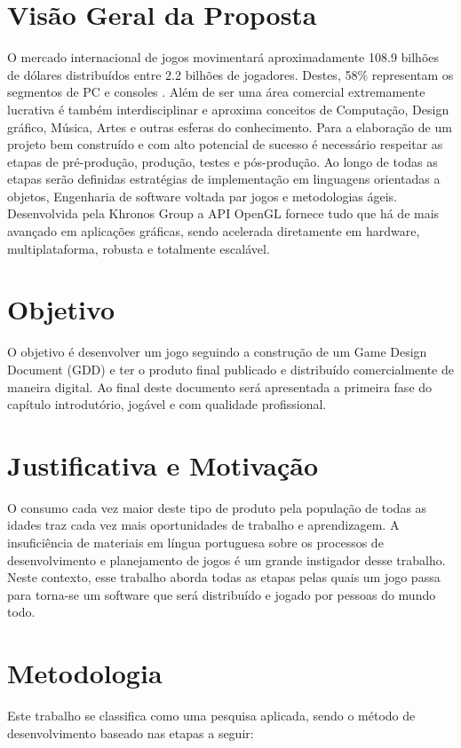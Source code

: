 \documentclass[12pt, 
openright, 
oneside, 
a4paper,    
brazil]{facom-ufu-abntex2}
\begin{document}
\section{Visão Geral da Proposta}
O mercado internacional de jogos movimentará aproximadamente 108.9
bilhões de dólares distribuídos entre 2.2 bilhões de jogadores. Destes, 58\%
representam os segmentos de PC e consoles \cite{GameMarketArticle}. Além de ser uma área
comercial extremamente lucrativa é também interdisciplinar e aproxima
conceitos de Computação, Design gráfico, Música, Artes e outras esferas do
conhecimento.
Para a elaboração de um projeto bem construído e com alto potencial de
sucesso é necessário respeitar as etapas de pré-produção, produção, testes
e pós-produção. Ao longo de todas as etapas serão definidas estratégias de
implementação em linguagens orientadas a objetos, Engenharia de software
voltada par jogos e metodologias ágeis.
Desenvolvida pela Khronos Group a API OpenGL fornece tudo que há de mais
avançado em aplicações gráficas, sendo acelerada diretamente em
hardware, multiplataforma, robusta e totalmente escalável.


\section{Objetivo}
O objetivo é desenvolver um jogo seguindo a construção de um Game Design
Document (GDD) e ter o produto final publicado e distribuído
comercialmente de maneira digital. Ao final deste documento será
apresentada a primeira fase do capítulo introdutório, jogável e com
qualidade profissional.

\section{Justificativa e Motivação}
O consumo cada vez maior deste tipo de produto pela população de todas as idades traz cada vez mais oportunidades de trabalho e aprendizagem.
A insuficiência de materiais em língua portuguesa sobre os processos de desenvolvimento e planejamento de jogos é um grande instigador desse trabalho. Neste contexto, esse trabalho aborda todas as etapas pelas quais um jogo passa para torna-se um software que será distribuído e jogado por pessoas do mundo todo.


\section{Metodologia}


Este trabalho se classifica como uma pesquisa aplicada, sendo o método de desenvolvimento baseado nas etapas a seguir:
\end{document}
